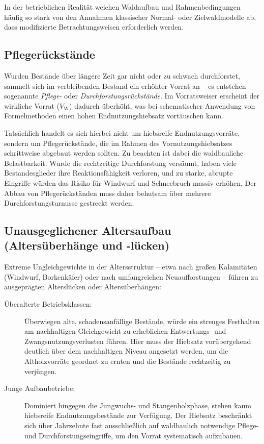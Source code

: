 \documentclass[twocolumn, paper=a4, fontsize=10pt]{scrartcl}
\begin{document}
In der betrieblichen Realität weichen Waldaufbau und Rahmenbedingungen häufig so stark von den Annahmen klassischer Normal- oder Zielwaldmodelle ab, dass modifizierte Betrachtungsweisen erforderlich werden.

\subsection{Pflegerückstände}

Wurden Bestände über längere Zeit gar nicht oder zu schwach durchforstet, sammelt sich im verbleibenden Bestand ein erhöhter Vorrat an -- es entstehen sogenannte \emph{Pflege-} oder \emph{Durchforstungsrückstände}. Im Vorratsweiser erscheint der wirkliche Vorrat ($V_{\text{W}}$) dadurch überhöht, was bei schematischer Anwendung von Formelmethoden einen hohen Endnutzungshiebsatz vortäuschen kann.

Tatsächlich handelt es sich hierbei nicht um hiebsreife Endnutzungsvorräte, sondern um Pflegerückstände, die im Rahmen des Vornutzungshiebsatzes schrittweise abgebaut werden sollten. Zu beachten ist dabei die waldbauliche Belastbarkeit. Wurde die rechtzeitige Durchforstung versäumt, haben viele Bestandesglieder ihre Reaktionsfähigkeit verloren, und zu starke, abrupte Eingriffe würden das Risiko für Windwurf und Schneebruch massiv erhöhen. Der Abbau von Pflegerückständen muss daher behutsam über mehrere Durchforstungsturnusse gestreckt werden.

\subsection{Unausgeglichener Altersaufbau (Altersüberhänge und -lücken)}

Extreme Ungleichgewichte in der Altersstruktur -- etwa nach großen Kalamitäten (Windwurf, Borkenkäfer) oder nach umfangreichen Neuaufforstungen -- führen zu ausgeprägten Alterslücken oder Altersüberhängen:

\begin{description}
\item[Überalterte Betriebsklassen:] Überwiegen alte, schadensanfällige Bestände, würde ein strenges Festhalten am nachhaltigen Gleichgewicht zu erheblichen Entwertungs- und Zwangsnutzungsverlusten führen. Hier muss der Hiebsatz vorübergehend deutlich über dem nachhaltigen Niveau angesetzt werden, um die Altholzvorräte geordnet zu ernten und die Bestände rechtzeitig zu verjüngen.
\item[Junge Aufbaubetriebe:] Dominiert hingegen die Jungwuchs- und Stangenholzphase, stehen kaum hiebsreife Endnutzungsbestände zur Verfügung. Der Hiebsatz beschränkt sich über Jahrzehnte fast ausschließlich auf waldbaulich notwendige Pflege- und Durchforstungseingriffe, um den Vorrat systematisch aufzubauen.
\end{description}
\end{document}
